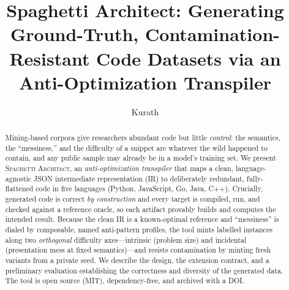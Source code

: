 \documentclass[sigconf,nonacm=false]{acmart}
\begin{document}
\title{Spaghetti Architect: Generating Ground-Truth, Contamination-Resistant Code Datasets via an Anti-Optimization Transpiler}

\author{Kurath}

\begin{abstract}
Mining-based corpora give researchers abundant code but little \emph{control}: the
semantics, the ``messiness,'' and the difficulty of a snippet are whatever the wild
happened to contain, and any public sample may already be in a model's training set.
We present \textsc{Spaghetti Architect}, an \emph{anti-optimization transpiler} that
maps a clean, language-agnostic JSON intermediate representation (IR) to deliberately
redundant, fully-flattened code in five languages (Python, JavaScript, Go, Java, C++).
Crucially, generated code is correct \emph{by construction} and every target is
compiled, run, and checked against a reference oracle, so each artifact provably
builds and computes the intended result. Because the clean IR is a known-optimal
reference and ``messiness'' is dialed by composable, named anti-pattern profiles, the
tool mints labelled instances along two \emph{orthogonal} difficulty axes---intrinsic
(problem size) and incidental (presentation mess at fixed semantics)---and resists
contamination by minting fresh variants from a private seed. We describe the design,
the extension contract, and a preliminary evaluation establishing the correctness and
diversity of the generated data. The tool is open source (MIT), dependency-free, and
archived with a DOI.
\end{abstract}

\begin{CCSXML}
\end{CCSXML}


\maketitle
\end{document}
